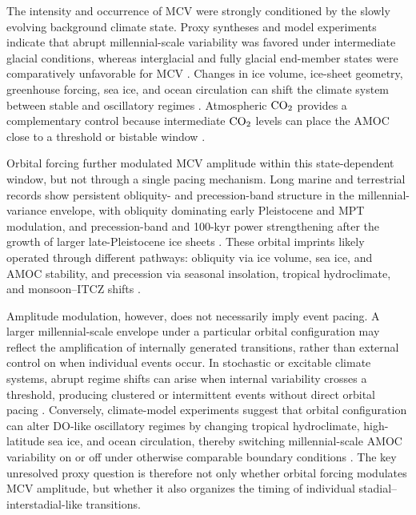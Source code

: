 \documentclass[11pt]{article}
\begin{document}
The intensity and occurrence of MCV were strongly conditioned by the slowly evolving background climate state. Proxy syntheses and model experiments indicate that abrupt millennial-scale variability was favored under intermediate glacial conditions, whereas interglacial and fully glacial end-member states were comparatively unfavorable for MCV \citep{dansgaard1993evidence, barker2011800, kawamura2007northern, malmierca2023dansgaard}. Changes in ice volume, ice-sheet geometry, greenhouse forcing, sea ice, and ocean circulation can shift the climate system between stable and oscillatory regimes \citep{zhang2017abrupt, vettoretti2022atmospheric, zhang2021direct, malmierca2023dansgaard}. Atmospheric \(\ce{CO2}\) \citep{bereiter2015revision} provides a complementary control because intermediate \(\ce{CO2}\) levels can place the AMOC close to a threshold or bistable window \citep{zhang2017abrupt, vettoretti2022atmospheric}. 


Orbital forcing further modulated MCV amplitude within this state-dependent window, but not through a single pacing mechanism. Long marine and terrestrial records show persistent obliquity- and precession-band structure in the millennial-variance envelope, with obliquity dominating early Pleistocene and MPT modulation, and precession-band and 100-kyr power strengthening after the growth of larger late-Pleistocene ice sheets \citep{sun2021persistent, hodell20231, thirumalai2020methane}. These orbital imprints likely operated through different pathways: obliquity via ice volume, sea ice, and AMOC stability, and precession via seasonal insolation, tropical hydroclimate, and monsoon--ITCZ shifts \citep{sun2021persistent, zhang2021direct}. 

Amplitude modulation, however, does not necessarily imply event pacing. A larger millennial-scale envelope under a particular orbital configuration may reflect the amplification of internally generated transitions, rather than external control on when individual events occur. In stochastic or excitable climate systems, abrupt regime shifts can arise when internal variability crosses a threshold, producing clustered or intermittent events without direct orbital pacing \citep{ditlevsen2005recurrence,kleppin2015stochastic}. Conversely, climate-model experiments suggest that orbital configuration can alter DO-like oscillatory regimes by changing tropical hydroclimate, high-latitude sea ice, and ocean circulation, thereby switching millennial-scale AMOC variability on or off under otherwise comparable boundary conditions \citep{zhang2021direct, malmierca2023dansgaard}. The key unresolved proxy question is therefore not only whether orbital forcing modulates MCV amplitude, but whether it also organizes the timing of individual stadial--interstadial-like transitions.
\end{document}
